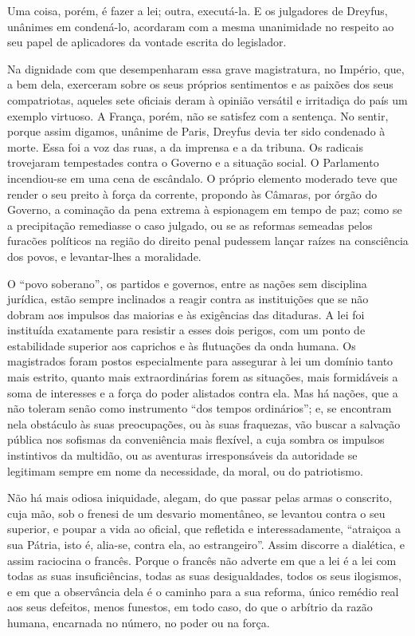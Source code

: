 Uma coisa, porém, é fazer a lei; outra, executá-la. E os julgadores de
Dreyfus, unânimes em condená-lo, acordaram com a mesma unanimidade no
respeito ao seu papel de aplicadores da vontade escrita do legislador.

Na dignidade com que desempenharam essa grave magistratura, no Império,
que, a bem dela, exerceram sobre os seus próprios sentimentos e as
paixões dos seus compatriotas, aqueles sete oficiais deram à opinião
versátil e irritadiça do país um exemplo virtuoso. A França, porém, não
se satisfez com a sentença. No sentir, porque assim digamos, unânime de
Paris, Dreyfus devia ter sido condenado à morte. Essa foi a voz das
ruas, a da imprensa e a da tribuna. Os radicais trovejaram tempestades
contra o Governo e a situação social. O Parlamento incendiou-se em
uma cena de escândalo. O próprio elemento moderado teve que render o
seu preito à força da corrente, propondo às Câmaras, por órgão do
Governo, a cominação da pena extrema à espionagem em tempo de paz; como
se a precipitação remediasse o caso julgado, ou se as reformas semeadas
pelos furacões políticos na região do direito penal pudessem lançar
raízes na consciência dos povos, e levantar-lhes a moralidade.

O ``povo soberano'', os partidos e governos,
entre as nações sem disciplina jurídica, estão sempre inclinados a
reagir contra as instituições que se não dobram aos impulsos das
maiorias e às exigências das ditaduras. A lei foi instituída exatamente
para resistir a esses dois perigos, com um ponto de estabilidade
superior aos caprichos e às flutuações da onda humana. Os magistrados
foram postos especialmente para assegurar à lei um domínio tanto
mais estrito, quanto mais extraordinárias forem as situações, mais
formidáveis a soma de interesses e a força do poder alistados contra
ela. Mas há nações, que a não toleram senão como instrumento
``dos tempos ordinários''; e, se encontram
nela obstáculo às suas preocupações, ou às suas fraquezas, vão buscar a
salvação pública nos sofismas da conveniência mais flexível, a cuja
sombra os impulsos instintivos da multidão, ou as aventuras
irresponsáveis da autoridade se legitimam sempre em nome da
necessidade, da moral, ou do patriotismo.

Não há mais odiosa iniquidade, alegam, do que passar pelas armas o
conscrito, cuja mão, sob o frenesi de um desvario momentâneo, se
levantou contra o seu superior, e poupar a vida ao oficial, que
refletida e interessadamente, ``atraiçoa a sua Pátria,
isto é, alia-se, contra ela, ao estrangeiro''. Assim
discorre a dialética, e assim raciocina o francês. Porque o francês não
adverte em que a lei é a lei com todas as suas insuficiências, todas as
suas desigualdades, todos os seus ilogismos, e em que a observância
dela é o caminho para a sua reforma, único remédio real aos seus
defeitos, menos funestos, em todo caso, do que o arbítrio da razão
humana, encarnada no número, no poder ou na força.

